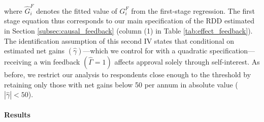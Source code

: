 \documentclass[12pt]{article} %
\begin{document}
\vspace{.5cm}


\noindent
where $\widehat{G}_i^F$ denotes the fitted value of $G_i^F$ from the first-stage regression. The first stage equation thus corresponds to our main specification of the RDD estimated in Section \ref{subsec:causal_feedback} (column (1) in Table \ref{tab:effect_feedback}). The identification assumption of this second IV states that conditional on estimated net gains $(\widehat{\gamma})$---which we control for with a quadratic specification---receiving a win feedback $(\widehat{\Gamma} = 1)$ affects approval solely through self-interest. As before, we restrict our analysis to respondents close enough to the threshold by retaining only those with net gains below 50\euros{} per annum in absolute value ($\left| \widehat{\gamma}\right|<50$).

\paragraph{Results}
\end{document}
